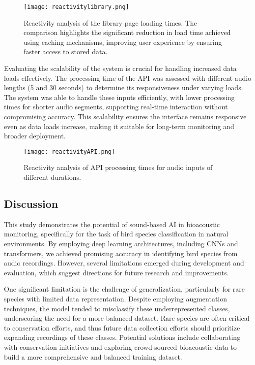 \begin{figure}[h!]
    \centering
    \texttt{[image: reactivitylibrary.png]}
    \caption{ Reactivity analysis of the library page loading times. The comparison highlights the significant reduction in load time achieved using caching mechanisms, improving user experience by ensuring faster access to stored data.}
    \vspace{0.1cm}
    \label{fig:reactivity_lib}
\end{figure}

Evaluating the scalability of the system is crucial for handling increased data loads effectively. The processing time of the API was assessed with different audio lengths (5 and 30 seconds) to determine its responsiveness under varying loads. The system was able to handle these inputs efficiently, with lower processing times for shorter audio segments, supporting real-time interaction without compromising accuracy. This scalability ensures the interface remains responsive even as data loads increase, making it suitable for long-term monitoring and broader deployment.

\begin{figure}[h!]
    \centering
    \texttt{[image: reactivityAPI.png]}
    \caption{Reactivity analysis of API processing times for audio inputs of different durations.}
    \vspace{0.1cm}
    \label{fig:reactivity_api}
\end{figure}

\subsection{Discussion}
This study demonstrates the potential of sound-based AI in bioacoustic monitoring, specifically for the task of bird species classification in natural environments. By employing deep learning architectures, including CNNs and transformers, we achieved promising accuracy in identifying bird species from audio recordings. However, several limitations emerged during development and evaluation, which suggest directions for future research and improvements.

One significant limitation is the challenge of generalization, particularly for rare species with limited data representation. Despite employing augmentation techniques, the model tended to misclassify these underrepresented classes, underscoring the need for a more balanced dataset. Rare species are often critical to conservation efforts, and thus future data collection efforts should prioritize expanding recordings of these classes. Potential solutions include collaborating with conservation initiatives and exploring crowd-sourced bioacoustic data to build a more comprehensive and balanced training dataset.


